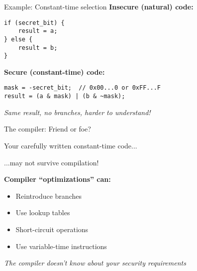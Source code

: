 \documentclass[aspectratio=169, lualatex, handout]{beamer}
\begin{document}
\begin{frame}{Example: Constant-time selection}
	\textbf{Insecure (natural) code:}
	\begin{flushleft}
		\texttt{if (secret\_bit) \{}\\
		\texttt{~~~~result = a;}\\
		\texttt{\} else \{}\\
		\texttt{~~~~result = b;}\\
		\texttt{\}}
	\end{flushleft}
	\vspace{0.5em}
	\textbf{Secure (constant-time) code:}
	\begin{flushleft}
		\texttt{mask = -secret\_bit;~~// 0x00...0 or 0xFF...F}\\
		\texttt{result = (a \& mask) | (b \& \textasciitilde mask);}
	\end{flushleft}
	\vspace{0.5em}
	\begin{center}
		\textit{Same result, no branches, harder to understand!}
	\end{center}
\end{frame}

\begin{frame}{The compiler: Friend or foe?}
	\begin{center}
		\Large
		Your carefully written constant-time code...

		\vspace{0.5em}

		...may not survive compilation!
	\end{center}
	\vspace{1em}
	\textbf{Compiler ``optimizations'' can:}
	\begin{itemize}
		\item Reintroduce branches
		\item Use lookup tables
		\item Short-circuit operations
		\item Use variable-time instructions
	\end{itemize}
	\vspace{0.5em}
	\begin{center}
		\textit{The compiler doesn't know about your security requirements}
	\end{center}
\end{frame}
\end{document}
